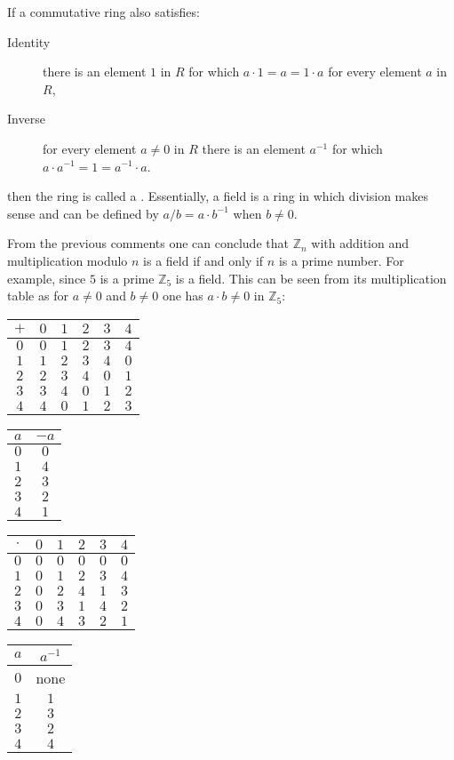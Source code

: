 If a commutative ring also satisfies:
\begin{description}
  \item[Identity] there is an element $1$ in $R$ for which $a\cdot1=a=1\cdot a$
  for every element $a$ in $R$,
  \item[Inverse] for every element $a\neq0$ in $R$ there is an element $a^{-1}$
  for which $a\cdot a^{-1}=1=a^{-1}\cdot a$.
\end{description}
then the ring is called a . Essentially, a field is a ring in which division
makes sense and can be defined by $a/b=a\cdot b^{-1}$ when $b\neq0$.

From the previous comments one can conclude that $\mathbb{Z}_n$ with addition and
multiplication modulo $n$ is a field if and only if $n$ is a prime number.
For example, since $5$ is a prime $\mathbb{Z}_5$ is a field.
This can be seen from its multiplication table as for $a\neq0$ and $b\neq0$
one has $a\cdot b\neq0$ in $\mathbb{Z}_5$:

\begin{tabular}{|c|ccccc|}\hline
  $+$ & $0$ & $1$ & $2$ & $3$ & $4$ \\ \hline
  $0$ & $0$ & $1$ & $2$ & $3$ & $4$ \\
  $1$ & $1$ & $2$ & $3$ & $4$ & $0$ \\
  $2$ & $2$ & $3$ & $4$ & $0$ & $1$ \\
  $3$ & $3$ & $4$ & $0$ & $1$ & $2$ \\
  $4$ & $4$ & $0$ & $1$ & $2$ & $3$ \\ \hline
\end{tabular}
\hfill
\begin{tabular}{|c|c|}\hline
  $a$ & $-a$ \\ \hline
  $0$ & $0$ \\
  $1$ & $4$ \\
  $2$ & $3$ \\
  $3$ & $2$ \\
  $4$ & $1$ \\ \hline
\end{tabular}
\hfill
\begin{tabular}{|c|ccccc|}\hline
  $\cdot$ & $0$ & $1$ & $2$ & $3$ & $4$ \\ \hline
  $0$ & $0$ & $0$ & $0$ & $0$ & $0$ \\
  $1$ & $0$ & $1$ & $2$ & $3$ & $4$ \\
  $2$ & $0$ & $2$ & $4$ & $1$ & $3$ \\
  $3$ & $0$ & $3$ & $1$ & $4$ & $2$ \\
  $4$ & $0$ & $4$ & $3$ & $2$ & $1$ \\ \hline
\end{tabular}
\hfill
\begin{tabular}{|c|c|}\hline
  $a$ & $a^{-1}$ \\ \hline
  $0$ & none \\
  $1$ & $1$ \\
  $2$ & $3$ \\
  $3$ & $2$ \\
  $4$ & $4$ \\ \hline
\end{tabular}


